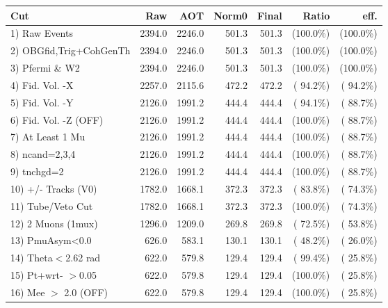  \begin{table}[h!]\centering
 \begin{tabular}{||l||r|r|r|r|r|r||}
 \hline
 \hline
 Cut & Raw & AOT & Norm0 & Final & Ratio & eff.       \\
 \hline
  1) Raw Events           &       2394.0 &       2246.0 &        501.3 &        501.3 & (100.0\%) & (100.0\%) \\
  2) OBGfid,Trig+CohGenTh &       2394.0 &       2246.0 &        501.3 &        501.3 & (100.0\%) & (100.0\%) \\
  3) Pfermi \& W2         &       2394.0 &       2246.0 &        501.3 &        501.3 & (100.0\%) & (100.0\%) \\
  4) Fid. Vol. -X         &       2257.0 &       2115.6 &        472.2 &        472.2 & ( 94.2\%) & ( 94.2\%) \\
  5) Fid. Vol. -Y         &       2126.0 &       1991.2 &        444.4 &        444.4 & ( 94.1\%) & ( 88.7\%) \\
  6) Fid. Vol. -Z (OFF)   &       2126.0 &       1991.2 &        444.4 &        444.4 & (100.0\%) & ( 88.7\%) \\
  7) At Least 1 Mu        &       2126.0 &       1991.2 &        444.4 &        444.4 & (100.0\%) & ( 88.7\%) \\
  8) ncand=2,3,4          &       2126.0 &       1991.2 &        444.4 &        444.4 & (100.0\%) & ( 88.7\%) \\
  9) tnchgd=2             &       2126.0 &       1991.2 &        444.4 &        444.4 & (100.0\%) & ( 88.7\%) \\
 10) +/- Tracks (V0)      &       1782.0 &       1668.1 &        372.3 &        372.3 & ( 83.8\%) & ( 74.3\%) \\
 11) Tube/Veto Cut        &       1782.0 &       1668.1 &        372.3 &        372.3 & (100.0\%) & ( 74.3\%) \\
 12) 2 Muons (1mux)       &       1296.0 &       1209.0 &        269.8 &        269.8 & ( 72.5\%) & ( 53.8\%) \\
 13) PmuAsym<0.0          &        626.0 &        583.1 &        130.1 &        130.1 & ( 48.2\%) & ( 26.0\%) \\
 14) Theta$<$2.62 rad     &        622.0 &        579.8 &        129.4 &        129.4 & ( 99.4\%) & ( 25.8\%) \\
 15) Pt+wrt- $>$0.05      &        622.0 &        579.8 &        129.4 &        129.4 & (100.0\%) & ( 25.8\%) \\
 16) Mee $>$ 2.0  (OFF)   &        622.0 &        579.8 &        129.4 &        129.4 & (100.0\%) & ( 25.8\%) \\

\end{tabular}
\end{table}
